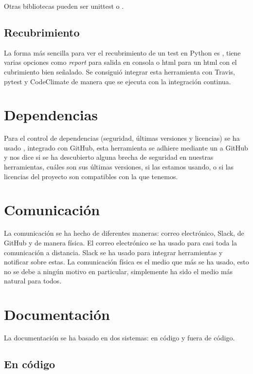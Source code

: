 Otras bibliotecas pueden ser unittest o .


\subsection{Recubrimiento}

La forma más sencilla para ver el recubrimiento de un test en Python es , tiene varias opciones como \emph{report} para salida en consola o html para un html con el cubrimiento bien señalado. Se consiguió integrar esta herramienta con Travis, pytest y CodeClimate de manera que se ejecuta con la integración continua.


\section{Dependencias}

Para el control de dependencias (seguridad, últimas versiones y licencias) se ha usado , integrado con GitHub, esta herramienta se adhiere mediante un  a GitHub y nos dice si se ha descubierto alguna brecha de seguridad en nuestras herramientas, cuáles son sus últimas versiones, si las estamos usando, o si las licencias del proyecto son compatibles con la que tenemos.


\section{Comunicación}

La comunicación se ha hecho de diferentes maneras: correo electrónico, Slack,  de GitHub y de manera física. El correo electrónico se ha usado para casi toda la comunicación a distancia. Slack se ha usado para integrar herramientas y notificar sobre estas. La comunicación física es el medio que más se ha usado, esto no se debe a ningún motivo en particular, simplemente ha sido el medio más natural para todos.


\section{Documentación}

La documentación se ha basado en dos sistemas: en código y fuera de código. 

\subsection{En código}

